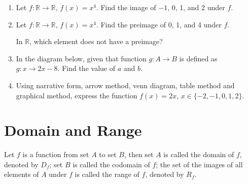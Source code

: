 \documentclass[12pt]{report}
\begin{document}
\begin{multicols}{2}
\begin{enumerate}
    \item Let $f: \mathbb{R} \to \mathbb{R}$, $f(x) = x^4$. Find the image of $-1$, 0, 1,
          and 2 under $f$.

    \item Let $f: \mathbb{R} \to \mathbb{R}$, $f(x) = x^4$. Find the preimage of 0, 1,
          and 4 under $f$.

          In $\mathbb{R}$, which element does not have a preimage?

    \item In the diagram below, given that function $g: A \to B$ is defined as $g: x \to
            2x - 8$. Find the value of $a$ and $b$.
          \begin{center}
          \end{center}

    \item Using narrative form, arrow method, venn diagram, table method and graphical
          method, express the function $f(x) = 2x$, $x \in \{-2, -1, 0, 1, 2\}$.
  \end{enumerate}
\end{multicols}
\newpage
\section{Domain and Range}

\begin{mdframed}[style=MyFrame]
  Let $f$ is a function from set $A$ to set $B$, then set $A$ is called the domain of $f$, denoted by $D_f$; set $B$ is called the codomain of $f$; the set of the images of all elements of $A$ under $f$ is called the range of $f$, denoted by $R_f$.
\end{mdframed}
\end{document}
